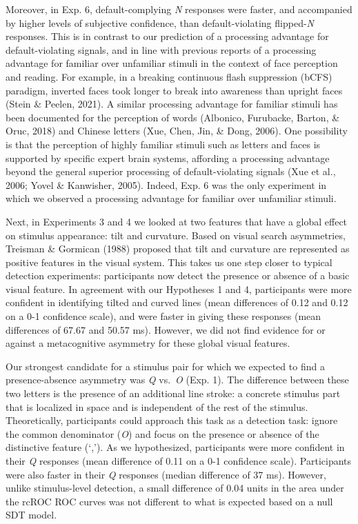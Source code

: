 \documentclass[12pt,twoside]{reedthesis}
\begin{document}
Moreover, in Exp. 6, default-complying \emph{N} responses were faster, and accompanied by higher levels of subjective confidence, than default-violating flipped-\emph{N} responses. This is in contrast to our prediction of a processing advantage for default-violating signals, and in line with previous reports of a processing advantage for familiar over unfamiliar stimuli in the context of face perception and reading. For example, in a breaking continuous flash suppression (bCFS) paradigm, inverted faces took longer to break into awareness than upright faces (Stein \& Peelen, 2021). A similar processing advantage for familiar stimuli has been documented for the perception of words (Albonico, Furubacke, Barton, \& Oruc, 2018) and Chinese letters (Xue, Chen, Jin, \& Dong, 2006). One possibility is that the perception of highly familiar stimuli such as letters and faces is supported by specific expert brain systems, affording a processing advantage beyond the general superior processing of default-violating signals (Xue et al., 2006; Yovel \& Kanwisher, 2005). Indeed, Exp. 6 was the only experiment in which we observed a processing advantage for familiar over unfamiliar stimuli.

Next, in Experiments 3 and 4 we looked at two features that have a global effect on stimulus appearance: tilt and curvature. Based on visual search asymmetries, Treisman \& Gormican (1988) proposed that tilt and curvature are represented as positive features in the visual system. This takes us one step closer to typical detection experiments: participants now detect the presence or absence of a basic visual feature. In agreement with our Hypotheses 1 and 4, participants were more confident in identifying tilted and curved lines (mean differences of 0.12 and 0.12 on a 0-1 confidence scale), and were faster in giving these responses (mean differences of 67.67 and 50.57 ms). However, we did not find evidence for or against a metacognitive asymmetry for these global visual features.

Our strongest candidate for a stimulus pair for which we expected to find a presence-absence asymmetry was \emph{Q} vs.~\emph{O} (Exp. 1). The difference between these two letters is the presence of an additional line stroke: a concrete stimulus part that is localized in space and is independent of the rest of the stimulus. Theoretically, participants could approach this task as a detection task: ignore the common denominator (\emph{O}) and focus on the presence or absence of the distinctive feature (`,'). As we hypothesized, participants were more confident in their \emph{Q} responses (mean difference of 0.11 on a 0-1 confidence scale). Participants were also faster in their \emph{Q} responses (median difference of 37 ms). However, unlike stimulus-level detection, a small difference of 0.04 units in the area under the rcROC ROC curves was not different to what is expected based on a null SDT model.
\end{document}
